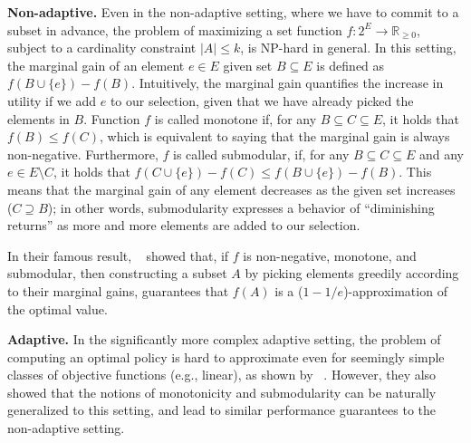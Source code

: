\documentclass{article}
\newcommand{\citet}[1]{\citeauthor{#1}~\shortcite{#1}}
\renewcommand{\paragraph}[1]{\vspace{0.3em}\noindent\textbf{#1.}\makebox[0.5em]{}}
\begin{document}
\paragraph{Non-adaptive}
Even in the non-adaptive setting, where we have to commit to a subset in advance, the problem of maximizing a set function $f : 2^E \to \mathbb{R}_{\geq 0}$, subject to a cardinality constraint $|A| \leq k$, is NP-hard in general.
In this setting, the marginal gain of an element $e \in E$ given set $B \subseteq E$ is defined as $f(B \cup \{e\}) - f(B)$.
Intuitively, the marginal gain quantifies the increase in utility if we add $e$ to our selection, given that we have already picked the elements in $B$.
Function $f$ is called monotone if, for any $B \subseteq C \subseteq E$, it holds that $f(B) \leq f(C)$, which is equivalent to saying that the marginal gain is always non-negative.
Furthermore, $f$ is called submodular, if, for any $B \subseteq C \subseteq E$ and any $e \in E \setminus C$, it holds that $f(C \cup \{e\}) - f(C) \leq  f(B \cup \{e\}) - f(B)$.
This means that the marginal gain of any element decreases as the given set increases ($C \supseteq B$); in other words, submodularity expresses a behavior of ``diminishing returns'' as more and more elements are added to our selection.

In their famous result, \citet{nemhauser78} showed that, if $f$ is non-negative, monotone, and submodular, then constructing a subset $A$ by picking elements greedily according to their marginal gains, guarantees that $f(A)$ is a ($1 - 1/e$)-approximation of the optimal value.

\paragraph{Adaptive}
In the significantly more complex adaptive setting, the problem of computing an optimal policy is hard to approximate even for seemingly simple classes of objective functions (e.g., linear), as shown by \citet{golovin11}.
However, they also showed that the notions of monotonicity and submodularity can be naturally generalized to this setting, and lead to similar performance guarantees to the non-adaptive setting.
\end{document}
